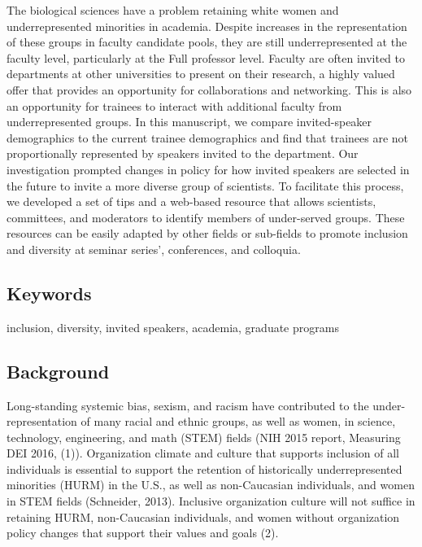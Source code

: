 \documentclass[10pt,]{article}
\begin{document}
The biological sciences have a problem retaining white women and
underrepresented minorities in academia. Despite increases in the
representation of these groups in faculty candidate pools, they are
still underrepresented at the faculty level, particularly at the Full
professor level. Faculty are often invited to departments at other
universities to present on their research, a highly valued offer that
provides an opportunity for collaborations and networking. This is also
an opportunity for trainees to interact with additional faculty from
underrepresented groups. In this manuscript, we compare invited-speaker
demographics to the current trainee demographics and find that trainees
are not proportionally represented by speakers invited to the
department. Our investigation prompted changes in policy for how invited
speakers are selected in the future to invite a more diverse group of
scientists. To facilitate this process, we developed a set of tips and a
web-based resource that allows scientists, committees, and moderators to
identify members of under-served groups. These resources can be easily
adapted by other fields or sub-fields to promote inclusion and diversity
at seminar series', conferences, and colloquia.

\subsection{Keywords}\label{keywords}

inclusion, diversity, invited speakers, academia, graduate programs

\newpage

\subsection{Background}\label{background}

Long-standing systemic bias, sexism, and racism have contributed to the
under-representation of many racial and ethnic groups, as well as women,
in science, technology, engineering, and math (STEM) fields (NIH 2015
report, Measuring DEI 2016, (1)). Organization climate and culture that
supports inclusion of all individuals is essential to support the
retention of historically underrepresented minorities (HURM) in the
U.S., as well as non-Caucasian individuals, and women in STEM fields
(Schneider, 2013). Inclusive organization culture will not suffice in
retaining HURM, non-Caucasian individuals, and women without
organization policy changes that support their values and goals (2).
\end{document}

